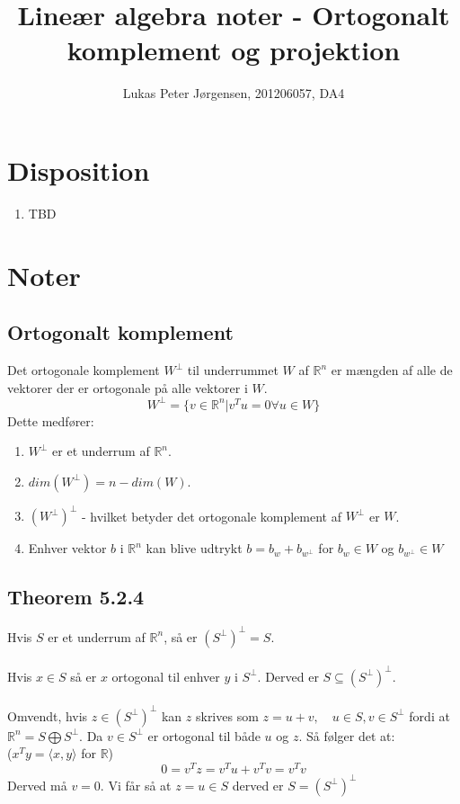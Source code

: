 \documentclass[a4paper,oneside,article]{memoir}
\newcommand{\inner}[2]{\langle #1,#2 \rangle}
\begin{document}
    \title{Lineær algebra noter - Ortogonalt komplement og projektion}
    \author{Lukas Peter Jørgensen, 201206057, DA4
            }
    \maketitle
    
    \tableofcontents
        
    \chapter{Disposition}
    \begin{enumerate}
    \item TBD
    \end{enumerate}
    
	\chapter{Noter}
	
	\section{Ortogonalt komplement}
	Det ortogonale komplement $W^\perp$ til underrummet $W$ af
	$\mathbb{R}^n$ er mængden af alle de vektorer der er ortogonale
	på alle vektorer i $W$.
	$$W^\perp = \{v\in \mathbb{R}^n |v^Tu=0 \forall u \in W \}$$
	Dette medfører: 
	\begin{enumerate}
	\item $W^\perp$ er et underrum af $\mathbb{R}^n$.
	\item $dim(W^\perp)=n-dim(W)$.
	\item $(W^\perp)^\perp$ - hvilket betyder det ortogonale komplement
	af $W^\perp$ er $W$.
	\item Enhver vektor $b$ i $\mathbb{R}^n$ kan blive udtrykt $b=b_w+b_{w^\perp}$
	for $b_w\in W$ og $b_{w^\perp} \in W$ 
	\end{enumerate}
	
	\section{Theorem 5.2.4}
	Hvis $S$ er et underrum af $\mathbb{R}^n$, så er $(S^\perp)^\perp=S$.
	\\
	\\
	Hvis $x \in S$ så er $x$ ortogonal til enhver $y$ i $S^\perp$.
	Derved er $S\subseteq (S^\perp)^\perp$.\\
	\\
	Omvendt, hvis $z\in (S^\perp)^\perp$ kan $z$ skrives som
	$z=u+v,\quad u\in S, v\in S^\perp$ fordi at 
	$\mathbb{R}^n=S\bigoplus S^\perp$. Da $v\in S^\perp$ er 
	ortogonal til både $u$ og $z$. Så følger det at:\\
	($x^Ty=\inner{x}{y}$ for $\mathbb{R}$)
	$$0=v^Tz=v^Tu+v^Tv=v^Tv$$
	Derved må $v=0$. Vi får så at $z=u\in S$ derved 
	er $S=(S^\perp)^\perp$
	
\end{document}
